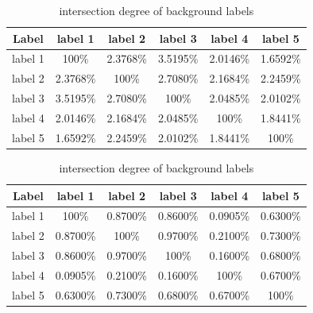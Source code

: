 \documentclass[runningheads,a4paper]{llncs}
\begin{document}
\begin{table}
\parbox{.35\linewidth}{
\centering
\begin{tabular}{|c|c|c|c|c|c|}
\hline
 Label & label 1 & label 2 & label 3 & label 4& label 5 \\
\hline
label 1 & 100\% & 2.3768\% & 3.5195\% & 2.0146\%& 1.6592\% \\
\hline
label 2 & 2.3768\% & 100\% & 2.7080\% & 2.1684\%& 2.2459\% \\
\hline
label 3 & 3.5195\% & 2.7080\% & 100\% & 2.0485\%& 2.0102\%\\
\hline
label 4 & 2.0146\% & 2.1684\% & 2.0485\% & 100\%& 1.8441\% \\
\hline
label 5 & 1.6592\% & 2.2459\% & 2.0102\% & 1.8441\%& 100\% \\
\hline
\end{tabular}
\captionsetup{justification=centerlast}
\caption{intersection degree of foreground labels}
\label{ta:intersection degree f}
}
\hfill
\parbox{.35\linewidth}{
\centering
\begin{tabular}{|c|c|c|c|c|c|}
\hline
 Label & label 1 & label 2 & label 3 & label 4& label 5 \\
\hline
label 1 & 100\% & 0.8700\% & 0.8600\% & 0.0905\%& 0.6300\% \\
\hline
label 2 & 0.8700\% & 100\% & 0.9700\% & 0.2100\%& 0.7300\% \\
\hline
label 3 & 0.8600\% & 0.9700\% & 100\% & 0.1600\%& 0.6800\%\\
\hline
label 4 & 0.0905\% & 0.2100\% & 0.1600\% & 100\%& 0.6700\% \\
\hline
label 5 & 0.6300\% & 0.7300\% & 0.6800\% & 0.6700\% & 100\% \\
\hline
\end{tabular}
\captionsetup{justification=centerlast}
\caption{intersection degree of background labels}
\label{ta:intersection degree b}
}
\end{table}
\end{document}
